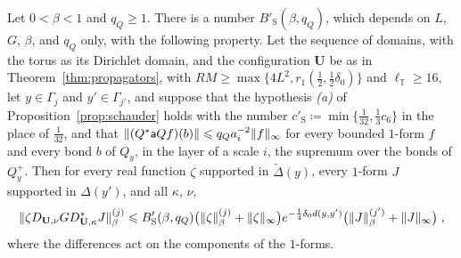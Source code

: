 \documentclass[11pt]{preprint}
\DeclarePairedDelimiter{\norm}{\lVert}{\rVert}
\numberwithin{equation}{section}
\begin{document}
\begin{corollary}\label{cor:schauder-vector}
Let $0 < \beta < 1$ and $q_Q \geqslant 1$. There is a number $B'_{\mathrm S}(\beta, q_Q)$, which depends on $L$, $G$, $\beta$, and $q_Q$ only, with the following property. Let the sequence of domains, with the torus as its Dirichlet domain, and the configuration $\mathbf U$ be as in Theorem~\ref{thm:propagators}, with $RM \geqslant \max\{ 4L^2, r_1(\frac{1}{2}, \frac{1}{2}\delta_0) \}$ and $\ell_{\mathbb T} \geqslant 16$, let $y \in \Gamma_j$ and $y' \in \Gamma_{j'}$, and suppose that the hypothesis \emph{(a)} of Proposition~\ref{prop:schauder} holds with the number $c'_{\mathrm S} \coloneqq \min\{ \frac{1}{32}, \frac{1}{3}c_6 \}$ in the place of $\frac{1}{32}$, and that $\norm{(Q^*\mathsf aQf)(b)} \leqslant q_Qa_i^{-2}\norm f_\infty$ for every bounded $1$-form $f$ and every bond $b$ of $Q_y$, in the layer of a scale $i$, the supremum over the bonds of $Q^+_y$. Then for every real function $\zeta$ supported in $\tilde\Delta(y)$, every $1$-form $J$ supported in $\Delta(y')$, and all $\kappa$, $\nu$,
\begin{equation}\label{eq:schauder-vector}
    \norm{\zeta D_{\mathbf U,\nu}GD^*_{\mathbf U,\kappa}J}^{(j)}_\beta \leqslant B'_{\mathrm S}(\beta, q_Q)\bigl(\norm\zeta^{(j)}_\beta + \norm\zeta_\infty\bigr)e^{-\frac{1}{4}\delta_0d(y, y')}\bigl(\norm J^{(j')}_\beta + \norm J_\infty\bigr)\;,
\end{equation}
where the differences act on the components of the $1$-forms.
\end{corollary}
\end{document}
